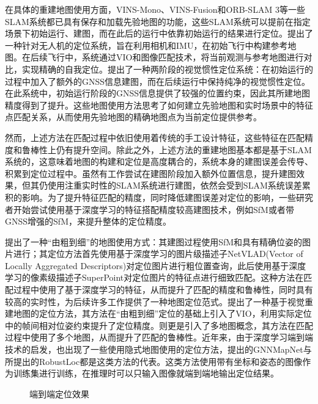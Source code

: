 在具体的重建地图使用方面，VINS-Mono、VINS-Fusion和ORB-SLAM 3等一些SLAM系统都已具有保存和加载先验地图的功能，这些SLAM系统可以提前在指定场景下初始运行、建图，而在此后的运行中依靠初始运行的结果进行定位。\citet{surber2017robust}提出了一种针对无人机的定位系统，旨在利用相机和IMU，在初始飞行中构建参考地图。在后续飞行中，系统通过VIO和图像匹配技术，将当前观测与参考地图进行对比，实现精确的自我定位。\citet{hao2023global}提出了一种两阶段的视觉惯性定位系统：在初始运行的过程中加入了额外的GNSS信息建图，而在后续运行中保持纯净的视觉惯性定位。在此系统中，初始运行阶段的GNSS信息提供了较强的位置约束，因此其所建地图精度得到了提升。这些地图使用方法思考了如何建立先验地图和实时场景中的特征点匹配关系，从而使用先验地图的精确地图点为当前定位提供参考。

然而，上述方法在匹配过程中依旧使用着传统的手工设计特征，这些特征在匹配精度和鲁棒性上仍有提升空间。除此之外，上述方法的重建地图基本都是基于SLAM系统的，这意味着地图的构建和定位是高度耦合的，系统本身的建图误差会传导、积累到定位过程中。虽然有工作\cite{hao2023global}尝试在建图阶段加入额外位置信息，提升建图效果，但其仍使用注重实时性的SLAM系统进行建图，依然会受到SLAM系统误差累积的影响。为了提升特征匹配的精度，同时降低建图误差对定位的影响，一些研究者开始尝试使用基于深度学习的特征搭配精度较高建图技术，例如SfM或者带GNSS增强的SfM\cite{vincentqin2022colmapgps}，来提升整体的定位精度。

\citet{sarlin2019coarse}提出了一种“由粗到细”的地图使用方式：其建图过程使用SfM和具有精确位姿的图片进行；其定位方法首先使用基于深度学习的图片级描述子NetVLAD(Vector of Locally Aggregated Descriptors)\cite{arandjelovic2016netvlad}对定位图片进行粗位置查询，此后使用基于深度学习的像素级描述子SuperPoint\cite{detone2018superpoint}对定位图片的特征点进行细致匹配。这种方法在匹配过程中使用了基于深度学习的特征，从而提升了匹配的精度和鲁棒性，同时具有较高的实时性，为后续许多工作提供了一种地图定位范式。\citet{yang2022real}提出了一种基于视觉重建地图的定位方法，其方法在“由粗到细”定位的基础上引入了VIO，利用实际定位中的帧间相对位姿约束提升了定位精度。\citet{lin2023visual}则更是引入了多地图概念，其方法在匹配过程中使用了多个地图，从而提升了匹配的鲁棒性。近年来，由于深度学习端到端技术的启发，也出现了一些使用隐式地图使用的定位方法，\citet{xue2020learning}提出的GNNMapNet与\citet{wang2023robustloc}所提出的RobustLoc都是这类方法的代表。这类方法使用带有坐标和姿态的图像作为训练集进行训练，在推理时可以只输入图像就端到端地输出定位结果。

\begin{figure}
  \centering
  \caption{端到端定位效果}
  \label{fig:e2eloc}
\end{figure}

